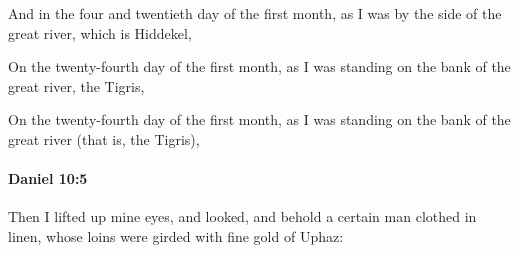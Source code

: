 			\begin{versebox}
					\item[BHS] 
					\item[LXX] 
					\item[ASV] And in the four and twentieth day of the first month, as I was by the side of the great river, which is Hiddekel,
					\item[NIV] On the twenty-fourth day of the first month, as I was standing on the bank of the great river, the Tigris,
					\item[NRSV] On the twenty-fourth day of the first month, as I was standing on the bank of the great river (that is, the Tigris),
			\end{versebox}

		\paragraph{Daniel 10:5} %
			\label{DANIEL-10-5}

			Then I lifted up mine eyes, and looked, and behold a certain man clothed in linen, whose loins were girded with fine gold of Uphaz:

